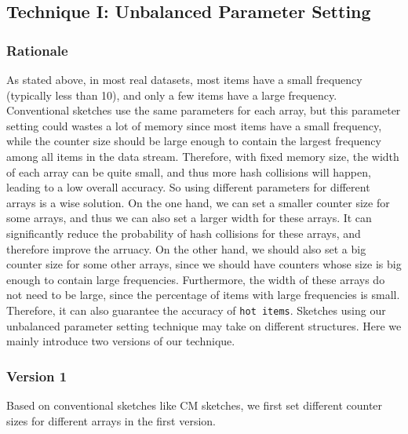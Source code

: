 \presub
\subsection{Technique I: Unbalanced Parameter Setting} \postsub

\presub
\subsubsection{Rationale} \postsub

As stated above, in most real datasets, most items have a small frequency (typically less than 10), and only a few items have a large frequency. 
Conventional sketches use the same parameters for each array, but this parameter setting could wastes a lot of memory since most items have a small frequency, while the counter size should be large enough to contain the largest frequency among all items in the data stream.
Therefore, with fixed memory size, the width of each array can be quite small, and thus more hash collisions will happen, leading to a low overall accuracy.
So using different parameters for different arrays is a wise solution.
On the one hand, we can set a smaller counter size for some arrays, and thus we can also set a larger width for these arrays.
It can significantly reduce the probability of hash collisions for these arrays, and therefore improve the arruacy.
On the other hand, we should also set a big counter size for some other arrays, since we should have counters whose size is big enough to contain large frequencies.
Furthermore, the width of these arrays do not need to be large, since the percentage of items with large frequencies is small.
Therefore, it can also guarantee the accuracy of \texttt{hot items}.
Sketches using our unbalanced parameter setting technique may take on different structures. Here we mainly introduce two versions of our technique.

\presub
\subsubsection{Version 1} \postsub

Based on conventional sketches like CM sketches, we first set different counter sizes for different arrays in the first version.

